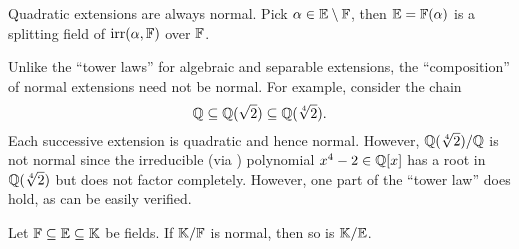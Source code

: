 \begin{ex}
    Quadratic extensions are always normal. Pick $\alpha \in \mathbb{E} \setminus \mathbb{F}$, then $\mathbb{E} = \mathbb{F}(\alpha)$ is a splitting field of $\operatorname{irr}(\alpha, \mathbb{F})$ over $\mathbb{F}$.
\end{ex}

\begin{rem}
    Unlike the ``tower laws'' for algebraic and separable extensions, the ``composition'' of normal extensions need not be normal. For example, consider the chain
    \[
        \mathbb{Q} \subseteq \mathbb{Q}(\sqrt{2}) \subseteq \mathbb{Q}(\sqrt[4]{2}).
    \]
    Each successive extension is quadratic and hence normal. However, $\mathbb{Q}(\sqrt[4]{2}) / \mathbb{Q}$ is not normal since the irreducible (via ) polynomial $x^4 - 2 \in \mathbb{Q}[x]$ has a root in $\mathbb{Q}(\sqrt[4]{2})$ but does not factor completely. However, one part of the ``tower law'' does hold, as can be easily verified. 
\end{rem}

\begin{prop}
    Let $\mathbb{F} \subseteq \mathbb{E} \subseteq \mathbb{K}$ be fields. If $\mathbb{K}/\mathbb{F}$ is normal, then so is $\mathbb{K}/\mathbb{E}$.
\end{prop}

